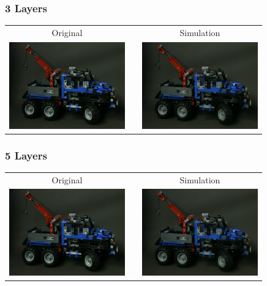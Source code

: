 \documentclass[12pt, compress]{beamer}
\begin{document}
\begin{frame}[fragile]
	\frametitle{3 Layers}
	
	\begin{center}
		\begin{tabular}{c p{0cm} c}
			Original & & Simulation \\
			\includegraphics[width = 5cm, trim={4cm, 20cm, 30cm, 0}, clip]{images/layers_and_projections/legotruck/original/08_08}
			& & \includegraphics[width = 5cm, trim={2cm, 10cm, 15cm, 0}, clip]{figures/simulated_views/legotruck/3Layers_legotruck/Reconstruction_of_view_(3,3)}
		\end{tabular}
	\end{center}
\end{frame}

\begin{frame}[fragile]
	\frametitle{5 Layers}
	
	\begin{center}
		\begin{tabular}{c p{0cm} c}
			Original & & Simulation \\
			\includegraphics[width = 5cm, trim={4cm, 20cm, 30cm, 0}, clip]{images/layers_and_projections/legotruck/original/08_08}
			& & \includegraphics[width = 5cm, trim={2cm, 10cm, 15cm, 0}, clip]{figures/simulated_views/legotruck/5Layers_legotruck/Reconstruction_of_view_(3,3)}
		\end{tabular}
	\end{center}
\end{frame}
\end{document}

